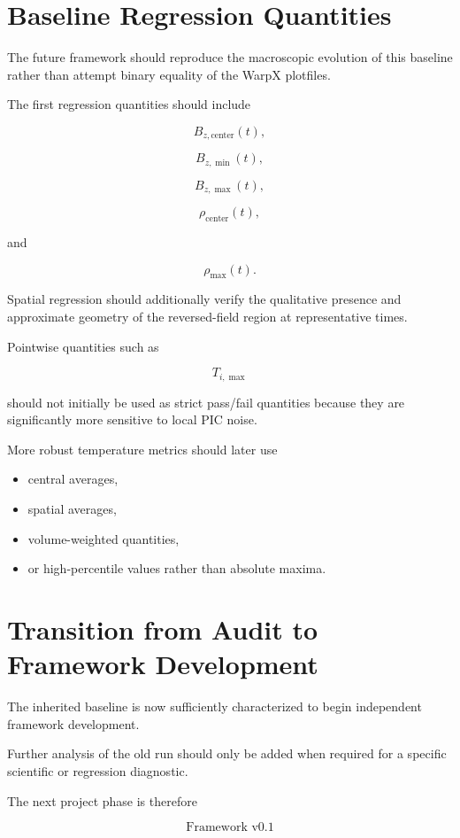\documentclass[11pt,a4paper]{article}
\begin{document}
\section{Baseline Regression Quantities}

The future framework should reproduce the macroscopic evolution of this
baseline rather than attempt binary equality of the WarpX plotfiles.

The first regression quantities should include

\[
B_{z,\mathrm{center}}(t),
\]

\[
B_{z,\min}(t),
\]

\[
B_{z,\max}(t),
\]

\[
\rho_{\mathrm{center}}(t),
\]

and

\[
\rho_{\max}(t).
\]

Spatial regression should additionally verify the qualitative presence and
approximate geometry of the reversed-field region at representative times.

Pointwise quantities such as

\[
T_{i,\max}
\]

should not initially be used as strict pass/fail quantities because they are
significantly more sensitive to local PIC noise.

More robust temperature metrics should later use

\begin{itemize}
    \item central averages,
    \item spatial averages,
    \item volume-weighted quantities,
    \item or high-percentile values rather than absolute maxima.
\end{itemize}


\section{Transition from Audit to Framework Development}

The inherited baseline is now sufficiently characterized to begin independent
framework development.

Further analysis of the old run should only be added when required for a
specific scientific or regression diagnostic.

The next project phase is therefore

\[
\boxed{\text{Framework v0.1}}
\]
\end{document}
